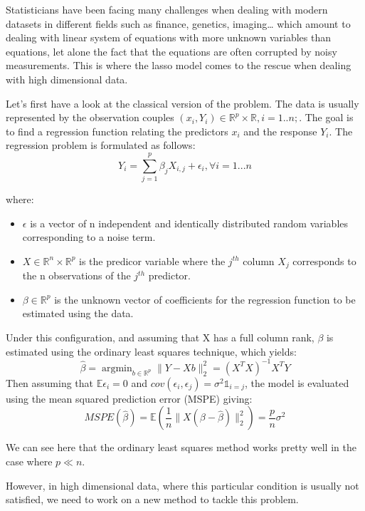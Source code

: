 \documentclass[10pt,onecolumn,letterpaper]{article}
\DeclareMathOperator*{\argmin}{argmin}
\begin{document}
Statisticians have been facing many challenges when dealing with modern datasets in different fields such as finance, genetics, imaging… which amount to dealing with linear system of equations with more unknown variables than equations, let alone the fact that the equations are often corrupted by noisy measurements. This is where the lasso model comes to the rescue when dealing with high dimensional data.
\newline

Let’s first have a look at the classical version of the problem. The data is usually represented by the observation couples $(x_i, Y_i)  \in \mathbb{R}^p \times \mathbb{R}, i = 1 .. n;$. The goal is to find a regression function relating the predictors $x_i$ and the response $Y_i$.
The regression problem is formulated as follows:
$$
Y_i = \sum_{j=1}^p \beta_j X_{i,j} + \epsilon_i, \forall i = 1...n
$$

where: 

\begin{itemize}
   \item $ \epsilon$ is a vector of n independent and identically distributed random variables corresponding to a noise term.
   \item $X \in \mathbb{R}^n \times \mathbb{R}^p $ is the predicor variable where the $j^{th}$ column $X_j$ corresponds to the n observations of the $j^{th}$ predictor. 
   \item  $\beta \in \mathbb{R}^p$ is the unknown vector of coefficients for the regression function to be estimated using the data.
\end{itemize}

Under this configuration, and assuming that X has a full column rank, $\beta$ is estimated using the ordinary least squares technique, which yields:
$$
\hat{\beta} = \argmin_{b \in \mathbb{R}^p} \lVert Y - Xb \rVert_2^2 = \left(X^TX\right)^{-1}X^TY
$$
Then assuming that $ \mathbb{E}\epsilon_i = 0$ and $cov(\epsilon_i, \epsilon_j) = \sigma^2 \mathds{1}_{i=j} $, the model is evaluated using the mean squared prediction error (MSPE) giving:
$$
MSPE(\hat{\beta}) = \mathbb{E}\left(\frac{1}{n} \lVert X\left(\beta - \hat{\beta}\right) \rVert^2_2 \right) = \frac{p}{n}\sigma^2
$$

We can see here that the ordinary least squares method works pretty well in the case where $p \ll n$. 

However, in high dimensional data, where this particular condition is usually not satisfied, we need to work on a new method to tackle this problem.\\
\end{document}
